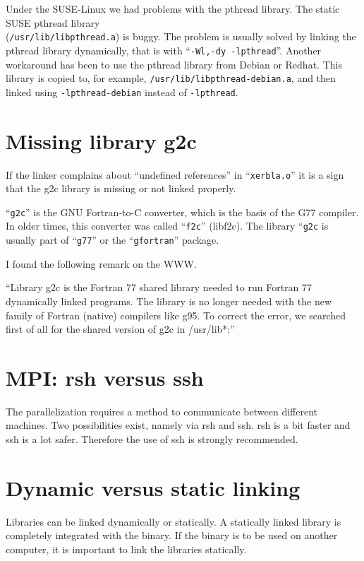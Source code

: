\documentclass[a4paper,10pt]{report}
\newcommand{\mytt}[1]{{\tt #1}}
\begin{document}
Under the SUSE-Linux we had problems with the pthread library.  The
static SUSE pthread library\\ (\mytt{/usr/lib/libpthread.a}) is
buggy. The problem is usually solved by linking the pthread library
dynamically, that is with ``\mytt{-Wl,-dy -lpthread}''.  Another
workaround has been to use the pthread library from Debian or Redhat.
This library is copied to, for example,
\mytt{/usr/lib/libpthread-debian.a}, and then linked using
\mytt{-lpthread-debian} instead of \mytt{-lpthread}.


\section{Missing library g2c}
\label{sec:problemg2c}
If the linker complains about ``undefined references'' in
``\mytt{xerbla.o}'' it is a sign that the g2c library is missing or
not linked properly.

``\mytt{g2c}'' is the GNU Fortran-to-C converter, which is the basis
of the G77 compiler. In older times, this converter was called
``\mytt{f2c}'' (libf2c). The library ``\mytt{g2c} is usually part of
``\mytt{g77}'' or the ``\mytt{gfortran}'' package.


I found the following remark on the WWW.

``Library g2c is the Fortran 77 shared library needed to run Fortran 77
dynamically linked programs. The library is no longer needed with the
new family of Fortran (native) compilers like g95.  To correct the
error, we searched first of all for the shared version of g2c in
/usr/lib*:''


\section{MPI: rsh versus ssh}
The parallelization requires a method to communicate between different
machines.  Two possibilities exist, namely via rsh and ssh. rsh is a
bit faster and ssh is a lot safer. Therefore the use of ssh is
strongly recommended.

\section{Dynamic versus static linking}
Libraries can be linked dynamically or statically. A statically linked
library is completely integrated with the binary. If the binary is to
be used on another computer, it is important to link the libraries statically.
\end{document}
